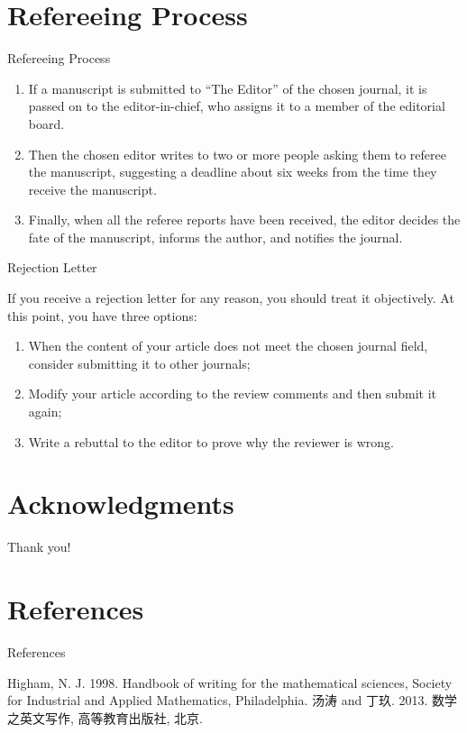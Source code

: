 \section{Refereeing Process}
\begin{frame}[<+->][t]{Refereeing Process}
	\begin{block}{}
		\begin{enumerate}
			\item If a manuscript is submitted to ``The Editor'' of the chosen journal, it is passed on to the editor-in-chief, who assigns it to a member of the editorial board.
			\item Then the chosen editor writes to two or more people asking them to referee the manuscript, suggesting a deadline about six weeks from the time they receive the manuscript.
			\item Finally, when all the referee reports have been received, the editor decides the fate of the manuscript, informs the author, and notifies the journal.
		\end{enumerate}
	\end{block}
\end{frame}

\begin{frame}[<+->][t]{Rejection Letter}
	\begin{block}{}
		If you receive a rejection letter for any reason, you should treat it objectively. At this point, you have three options:
		\begin{enumerate}
			\item When the content of your article does not meet the chosen journal field, consider submitting it to other journals; 
			\item Modify your article according to the review comments and then submit it again;
			\item Write a rebuttal to the editor to prove why the reviewer is wrong.
		\end{enumerate}
	\end{block}
\end{frame}


\section*{Acknowledgments}
\begin{frame}
    \centering\Huge Thank you!
\end{frame}


\section*{References}
\begin{frame}{References}
	\begin{thebibliography}{9}\large
         Higham, N. J. 1998. Handbook of writing for the mathematical sciences, Society for Industrial and Applied Mathematics, Philadelphia.
         汤涛 and 丁玖. 2013. 数学之英文写作, 高等教育出版社, 北京.
    \end{thebibliography}
\end{frame}
